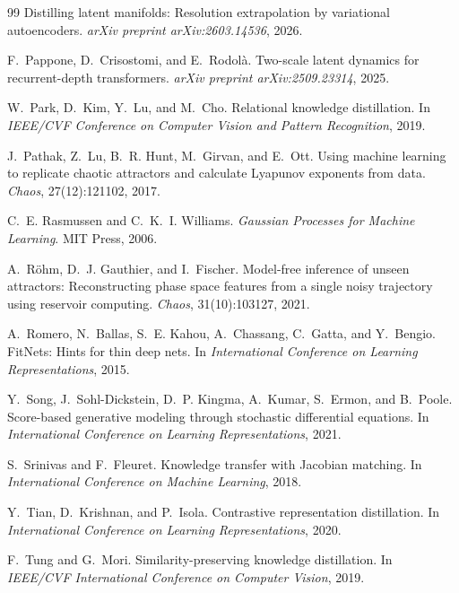 \documentclass[11pt]{article}
\begin{document}
\begin{thebibliography}{99}
Distilling latent manifolds: Resolution extrapolation by variational autoencoders.
\newblock \emph{arXiv preprint arXiv:2603.14536}, 2026.

F.~Pappone, D.~Crisostomi, and E.~Rodol\`a.
\newblock Two-scale latent dynamics for recurrent-depth transformers.
\newblock \emph{arXiv preprint arXiv:2509.23314}, 2025.

W.~Park, D.~Kim, Y.~Lu, and M.~Cho.
\newblock Relational knowledge distillation.
\newblock In \emph{IEEE/CVF Conference on Computer Vision and Pattern Recognition}, 2019.

J.~Pathak, Z.~Lu, B.~R. Hunt, M.~Girvan, and E.~Ott.
\newblock Using machine learning to replicate chaotic attractors and calculate Lyapunov exponents from data.
\newblock \emph{Chaos}, 27(12):121102, 2017.

C.~E. Rasmussen and C.~K.~I. Williams.
\newblock \emph{Gaussian Processes for Machine Learning}.
\newblock MIT Press, 2006.

A.~R\"ohm, D.~J. Gauthier, and I.~Fischer.
\newblock Model-free inference of unseen attractors: Reconstructing phase space features from a single noisy trajectory using reservoir computing.
\newblock \emph{Chaos}, 31(10):103127, 2021.

A.~Romero, N.~Ballas, S.~E. Kahou, A.~Chassang, C.~Gatta, and Y.~Bengio.
\newblock FitNets: Hints for thin deep nets.
\newblock In \emph{International Conference on Learning Representations}, 2015.

Y.~Song, J.~Sohl-Dickstein, D.~P. Kingma, A.~Kumar, S.~Ermon, and B.~Poole.
\newblock Score-based generative modeling through stochastic differential equations.
\newblock In \emph{International Conference on Learning Representations}, 2021.

S.~Srinivas and F.~Fleuret.
\newblock Knowledge transfer with Jacobian matching.
\newblock In \emph{International Conference on Machine Learning}, 2018.

Y.~Tian, D.~Krishnan, and P.~Isola.
\newblock Contrastive representation distillation.
\newblock In \emph{International Conference on Learning Representations}, 2020.

F.~Tung and G.~Mori.
\newblock Similarity-preserving knowledge distillation.
\newblock In \emph{IEEE/CVF International Conference on Computer Vision}, 2019.

\end{thebibliography}
\end{document}
